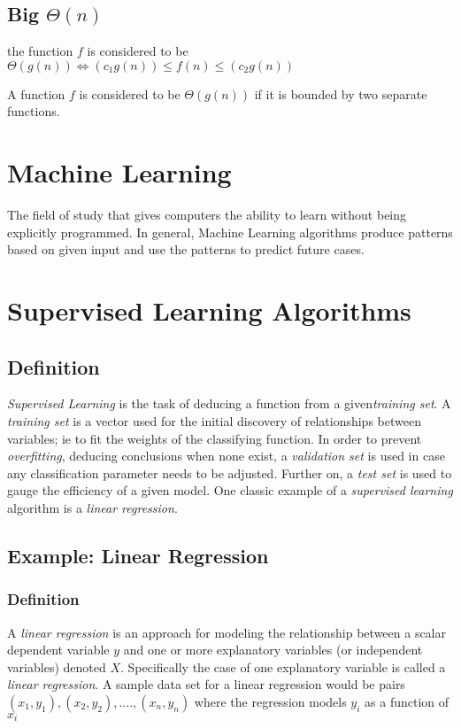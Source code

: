 \documentclass[a4paper]{article}
\newenvironment{definition}[1][Formal Definition]{\begin{trivlist}\item[\hskip \labelsep {\bfseries #1}]}{\end{trivlist}}
\newenvironment{indef}[1][Informal Definition]{\begin{trivlist}\item[\hskip \labelsep {\bfseries #1}]}{\end{trivlist}}
\begin{document}
\subsection{Big $\Theta(n)$}
\begin{definition}
the function $f$ is considered to be $\Theta(g(n)) \iff (c_1g(n)) \leq f(n) \leq (c_2g(n))$
\cite{Auckland} 
\end{definition}
\begin{indef}
A function $f$ is considered to be $\Theta(g(n))$ if it is bounded by two separate functions.	
\end{indef}

\section{Machine Learning}
The field of study that gives computers the ability to learn without being explicitly programmed. In general, Machine Learning algorithms produce patterns based on given input and use the patterns to predict future cases. 

\section{Supervised Learning Algorithms}
\subsection{Definition}
\textit{Supervised Learning} is the task of deducing a function from a given\textit{training set}. \cite{Ng} A \textit{training set} is a vector used for the initial discovery of relationships between variables; ie to fit the weights of the classifying function. In order to prevent \textit{overfitting}, deducing conclusions when none exist, a \textit{validation set} is used in case any classification parameter needs to be adjusted. Further on, a \textit{test set} is used to gauge the efficiency of a given model. One classic example of a \textit{supervised learning} algorithm is a \textit{linear regression}.
\subsection{Example: Linear Regression}
\subsubsection{Definition}
A \textit{linear regression} is an approach for modeling the relationship between a scalar dependent variable $y$ and one or more explanatory variables (or independent variables) denoted $X$. Specifically the case of one explanatory variable is called a \textit{linear regression}. A sample data set for a linear regression would be pairs $(x_1,y_1),(x_2,y_2),....,(x_n,y_n)$ where the regression models $y_i$ as a function of $x_i$
\end{document}
